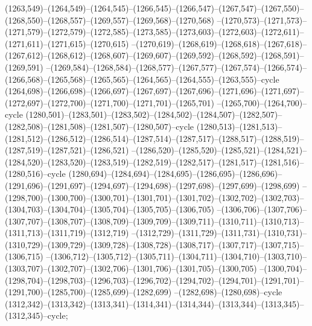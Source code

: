 (1263,549)--(1264,549)--(1264,545)--(1266,545)--(1266,547)--(1267,547)--(1267,550)--(1268,550)--(1268,557)--(1269,557)--(1269,568)--(1270,568)
--(1270,573)--(1271,573)--(1271,579)--(1272,579)--(1272,585)--(1273,585)--(1273,603)--(1272,603)--(1272,611)--(1271,611)--(1271,615)--(1270,615)
--(1270,619)--(1268,619)--(1268,618)--(1267,618)--(1267,612)--(1268,612)--(1268,607)--(1269,607)--(1269,592)--(1268,592)--(1268,591)--(1269,591)
--(1269,584)--(1268,584)--(1268,577)--(1267,577)--(1267,574)--(1266,574)--(1266,568)--(1265,568)--(1265,565)--(1264,565)--(1264,555)--(1263,555)--cycle
(1264,698)--(1266,698)--(1266,697)--(1267,697)--(1267,696)--(1271,696)--(1271,697)--(1272,697)--(1272,700)--(1271,700)--(1271,701)--(1265,701)
--(1265,700)--(1264,700)--cycle
(1280,501)--(1283,501)--(1283,502)--(1284,502)--(1284,507)--(1282,507)--(1282,508)--(1281,508)--(1281,507)--(1280,507)--cycle
(1280,513)--(1281,513)--(1281,512)--(1286,512)--(1286,514)--(1287,514)--(1287,517)--(1288,517)--(1288,519)--(1287,519)--(1287,521)--(1286,521)
--(1286,520)--(1285,520)--(1285,521)--(1284,521)--(1284,520)--(1283,520)--(1283,519)--(1282,519)--(1282,517)--(1281,517)--(1281,516)--(1280,516)--cycle
(1280,694)--(1284,694)--(1284,695)--(1286,695)--(1286,696)--(1291,696)--(1291,697)--(1294,697)--(1294,698)--(1297,698)--(1297,699)--(1298,699)
--(1298,700)--(1300,700)--(1300,701)--(1301,701)--(1301,702)--(1302,702)--(1302,703)--(1304,703)--(1304,704)--(1305,704)--(1305,705)--(1306,705)
--(1306,706)--(1307,706)--(1307,707)--(1308,707)--(1308,709)--(1309,709)--(1309,711)--(1310,711)--(1310,713)--(1311,713)--(1311,719)--(1312,719)
--(1312,729)--(1311,729)--(1311,731)--(1310,731)--(1310,729)--(1309,729)--(1309,728)--(1308,728)--(1308,717)--(1307,717)--(1307,715)--(1306,715)
--(1306,712)--(1305,712)--(1305,711)--(1304,711)--(1304,710)--(1303,710)--(1303,707)--(1302,707)--(1302,706)--(1301,706)--(1301,705)--(1300,705)
--(1300,704)--(1298,704)--(1298,703)--(1296,703)--(1296,702)--(1294,702)--(1294,701)--(1291,701)--(1291,700)--(1285,700)--(1285,699)--(1282,699)
--(1282,698)--(1280,698)--cycle
(1312,342)--(1313,342)--(1313,341)--(1314,341)--(1314,344)--(1313,344)--(1313,345)--(1312,345)--cycle;
